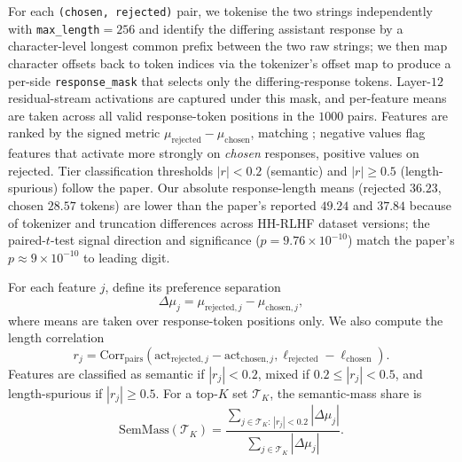For each \texttt{(chosen, rejected)} pair, we tokenise the two strings independently with \texttt{max\_length}$=256$ and identify the differing assistant response by a character-level longest common prefix between the two raw strings; we then map character offsets back to token indices via the tokenizer's offset map to produce a per-side \texttt{response\_mask} that selects only the differing-response tokens. Layer-$12$ residual-stream activations are captured under this mask, and per-feature means are taken across all valid response-token positions in the $1000$ pairs. Features are ranked by the signed metric $\mu_{\mathrm{rejected}}-\mu_{\mathrm{chosen}}$, matching \citet[\S4.5]{bhalla2025tsae}; negative values flag features that activate more strongly on \emph{chosen} responses, positive values on rejected. Tier classification thresholds $|r|<0.2$ (semantic) and $|r|\geq 0.5$ (length-spurious) follow the paper. Our absolute response-length means (rejected $36.23$, chosen $28.57$ tokens) are lower than the paper's reported $49.24$ and $37.84$ because of tokenizer and truncation differences across HH-RLHF dataset versions; the paired-$t$-test signal direction and significance ($p=9.76\times10^{-10}$) match the paper's $p\approx 9\times10^{-10}$ to leading digit.

For each feature $j$, define its preference separation
\[
    \Delta\mu_j
    =
    \mu_{\mathrm{rejected},j}-\mu_{\mathrm{chosen},j},
\]
where means are taken over response-token positions only. We also compute the
length correlation
\[
r_j = \mathrm{Corr}_{\text{pairs}}\!\left(
\mathrm{act}_{\mathrm{rejected},j}-\mathrm{act}_{\mathrm{chosen},j},
\ell_{\mathrm{rejected}}-\ell_{\mathrm{chosen}}
\right).
\]
Features are classified as semantic if $|r_j|<0.2$, mixed if
$0.2\leq |r_j|<0.5$, and length-spurious if $|r_j|\geq0.5$. For a top-$K$
set $\mathcal T_K$, the semantic-mass share is
\[
    \mathrm{SemMass}(\mathcal T_K)
    =
    \frac{\sum_{j\in\mathcal T_K:\, |r_j|<0.2} |\Delta\mu_j|}
         {\sum_{j\in\mathcal T_K} |\Delta\mu_j|}.
\]

